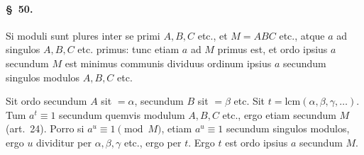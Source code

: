 \documentclass[12pt,a4paper]{article}
\theoremstyle{plain}
\theoremstyle{definition}
\theoremstyle{remark}
\newcommand{\art}[1]{\paragraph{\S\ #1.}}
\begin{document}
\art{50}
Si moduli sunt plures inter se primi $A, B, C$ etc., et $M = ABC$ etc., atque $a$ ad singulos $A, B, C$ etc. primus: tunc etiam $a$ ad $M$ primus est, et ordo ipsius $a$ secundum $M$ est minimus communis dividuus ordinum ipsius $a$ secundum singulos modulos $A, B, C$ etc.

Sit ordo secundum $A$ sit $= \alpha$, secundum $B$ sit $= \beta$ etc. Sit $t = \textrm{lcm}(\alpha, \beta, \gamma, \ldots)$. Tum $a^t \equiv 1$ secundum quemvis modulum $A, B, C$ etc., ergo etiam secundum $M$ (art.~24). Porro si $a^u \equiv 1 \pmod{M}$, etiam $a^u \equiv 1$ secundum singulos modulos, ergo $u$ dividitur per $\alpha, \beta, \gamma$ etc., ergo per $t$. Ergo $t$ est ordo ipsius $a$ secundum $M$.
\end{document}
